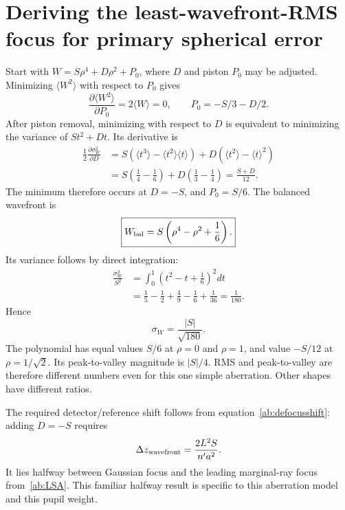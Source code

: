 \section{Deriving the least-wavefront-RMS focus for primary spherical error}
Start with $W=S\rho^4+D\rho^2+P_0$, where $D$ and piston $P_0$ may be
adjusted. Minimizing $\langle W^2\rangle$ with respect to $P_0$ gives
\begin{equation}
 \frac{\partial\langle W^2\rangle}{\partial P_0}
       =2\langle W\rangle=0,
 \qquad P_0=-S/3-D/2.
\end{equation}
After piston removal, minimizing with respect to $D$ is equivalent to
minimizing the variance of $St^2+Dt$. Its derivative is
\begin{align}
 \frac12\frac{\partial\sigma_W^2}{\partial D}
 &=S\left(\langle t^3\rangle-\langle t^2\rangle\langle t\rangle\right)
  +D\left(\langle t^2\rangle-\langle t\rangle^2\right)\\
 &=S\left(\frac14-\frac16\right)
       +D\left(\frac13-\frac14\right)=\frac{S+D}{12}.
\end{align}
The minimum therefore occurs at $D=-S$, and $P_0=S/6$. The balanced
wavefront is
\begin{equation}
 \boxed{W_{\rm bal}=S\left(\rho^4-\rho^2+\frac16\right).}
 \label{ab:balancedS}
\end{equation}
Its variance follows by direct integration:
\begin{align}
 \frac{\sigma_W^2}{S^2}
 &=\int_0^1\left(t^2-t+\frac16\right)^2dt\\
 &=\frac15-\frac12+\frac49-\frac16+\frac1{36}
  =\frac1{180}.
\end{align}
Hence
\begin{equation}
 \boxed{\sigma_W=\frac{|S|}{\sqrt{180}}.}
\end{equation}
The polynomial has equal values $S/6$ at $\rho=0$ and $\rho=1$, and value
$-S/12$ at $\rho=1/\sqrt2$. Its peak-to-valley magnitude is $|S|/4$.
RMS and peak-to-valley are therefore different numbers even for this one
simple aberration. Other shapes have different ratios.

The required detector/reference shift follows from
equation~\eqref{ab:defocusshift}: adding $D=-S$ requires
\begin{equation}
 \Delta z_{\rm wavefront}=\frac{2L^2S}{n'a^2}.
\end{equation}
It lies halfway between Gaussian focus and the leading marginal-ray focus
from~\eqref{ab:LSA}. This familiar halfway result is specific to this
aberration model and this pupil weight.

